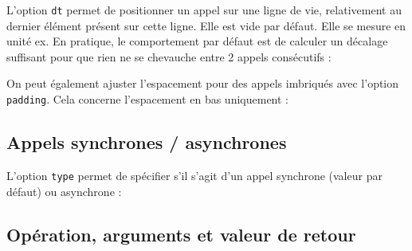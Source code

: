 \documentclass[a4paper,11pt]{report}
\newcommand{\inputTikZ}[1]{%
  }%
\newcommand{\inputTikZ}[1]{%
    \texttt{[image: fig/\#1.pdf]}%
  }%
\begin{document}
L'option {\tt dt} permet de positionner un appel sur une ligne de vie, relativement au dernier élément présent sur cette ligne. Elle est vide par défaut. Elle se mesure en unité ex. En pratique, le comportement par défaut est de calculer un décalage suffisant pour que rien ne se chevauche entre 2 appels consécutifs :

\medskip

\begin{minipage}{0.5\textwidth}

\end{minipage}
\begin{minipage}{0.5\textwidth}
\begin{center}
\inputTikZ{calldt}
\end{center}
\end{minipage}

\medskip

On peut également ajuster l'espacement pour des appels imbriqués avec l'option {\tt padding}. Cela concerne l'espacement en bas uniquement :

\medskip

\begin{minipage}{0.5\textwidth}

\end{minipage}
\begin{minipage}{0.5\textwidth}
\begin{center}
\inputTikZ{callpadding}
\end{center}
\end{minipage}

\subsection{Appels synchrones / asynchrones}\label{ss.callsync}

L'option {\tt type} permet de spécifier s'il s'agit d'un appel synchrone (valeur par défaut) ou asynchrone :

\medskip

\begin{minipage}{0.5\textwidth}

\end{minipage}
\begin{minipage}{0.5\textwidth}
\begin{center}
\inputTikZ{callsync}
\end{center}
\end{minipage}

\subsection{Opération, arguments et valeur de retour}\label{ss.callop}
\end{document}
